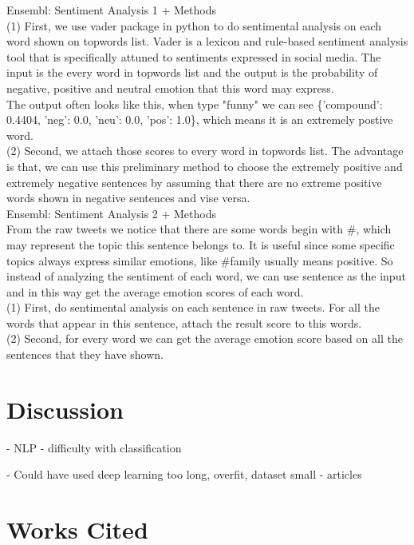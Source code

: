 \documentclass[]{article}
\begin{document}
Ensembl: Sentiment Analysis 1 + Methods \\
(1) First, we use vader package in python to do sentimental analysis on each word shown on topwords list. Vader is a lexicon and rule-based sentiment analysis tool that is specifically attuned to sentiments expressed in social media.
The input is the every word in topwords list and the output is the probability of negative, positive and neutral emotion that this word may express. \\
The output often looks like this, when type "funny" we can see \{'compound': 0.4404, 'neg': 0.0, 'neu': 0.0, 'pos': 1.0\}, which means it is an extremely postive word. \\
(2) Second, we attach those scores to every word in topwords list. The advantage is that, we can use this preliminary method to choose the extremely positive and extremely negative sentences by assuming that there are no
extreme positive words shown in negative sentences and vise versa. \\

Ensembl: Sentiment Analysis 2 + Methods\\
From the raw tweets we notice that there are some words begin with \#, which may represent the topic this sentence belongs to. It is useful since some specific topics always express similar emotions, like \#family usually means positive.
So instead of analyzing the sentiment of each word, we can use sentence as the input and in this way get the average emotion scores of each word.\\
(1) First, do sentimental analysis on each sentence in raw tweets. For all the words that appear in this sentence, attach the result score to this words. \\
(2) Second, for every word we can get the average emotion score based on all the sentences that they have shown.




\section{Discussion}

- NLP - difficulty with classification 

- Could have used deep learning 
	too long, overfit, dataset small
- articles 


\section{Works Cited}
\begin{thebibliography}{1}


\end{thebibliography}
\end{document}
